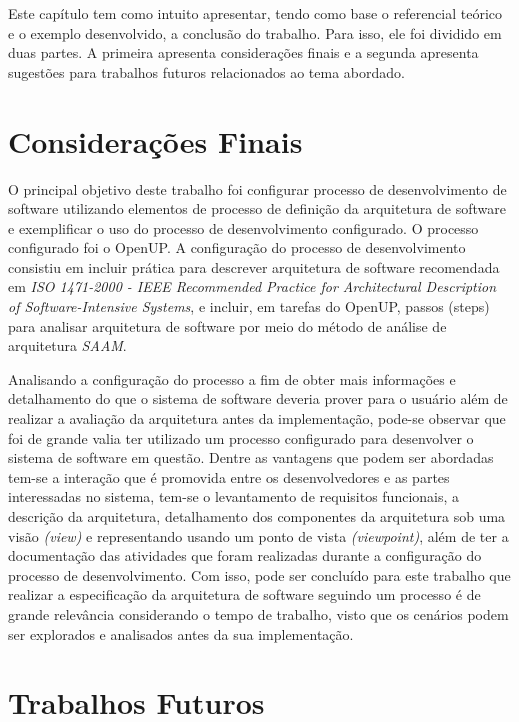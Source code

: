 Este capítulo tem como intuito apresentar, tendo como base o referencial teórico e o exemplo desenvolvido, a conclusão do trabalho. Para isso, ele foi dividido em duas partes. A primeira apresenta considerações finais e a segunda apresenta sugestões para trabalhos futuros relacionados ao tema abordado.

\section{Considerações Finais}

O principal objetivo deste trabalho foi configurar processo de desenvolvimento de software utilizando elementos de processo de definição da arquitetura de software e exemplificar o uso do processo de desenvolvimento configurado. O processo configurado foi o OpenUP.  A configuração do processo de desenvolvimento consistiu em incluir prática para descrever arquitetura de software recomendada em \emph{ISO 1471-2000 - IEEE Recommended Practice for Architectural Description of Software-Intensive Systems}, e incluir, em tarefas do OpenUP, passos (steps) para analisar arquitetura de software por meio do método de análise de arquitetura \emph{\acrfull{SAAM}}.

Analisando a configuração do processo a fim de obter mais informações e detalhamento do que o sistema de software deveria prover para o usuário além de realizar a avaliação da arquitetura antes da implementação, pode-se observar que foi de grande valia ter utilizado um processo configurado para desenvolver o sistema de software em questão. Dentre as vantagens que podem ser abordadas tem-se a interação que é promovida entre os desenvolvedores e as partes interessadas no sistema, tem-se o levantamento de requisitos funcionais, a descrição da arquitetura, detalhamento dos componentes da arquitetura sob uma visão \emph{(view)} e representando usando um ponto de vista \emph{(viewpoint)}, além de ter a documentação das atividades que foram realizadas durante a configuração do processo de desenvolvimento. Com isso, pode ser concluído para este trabalho que realizar a especificação da arquitetura de software seguindo um processo é de grande relevância considerando o tempo de trabalho, visto que os cenários podem ser explorados e analisados antes da sua implementação.

\section{Trabalhos Futuros}

